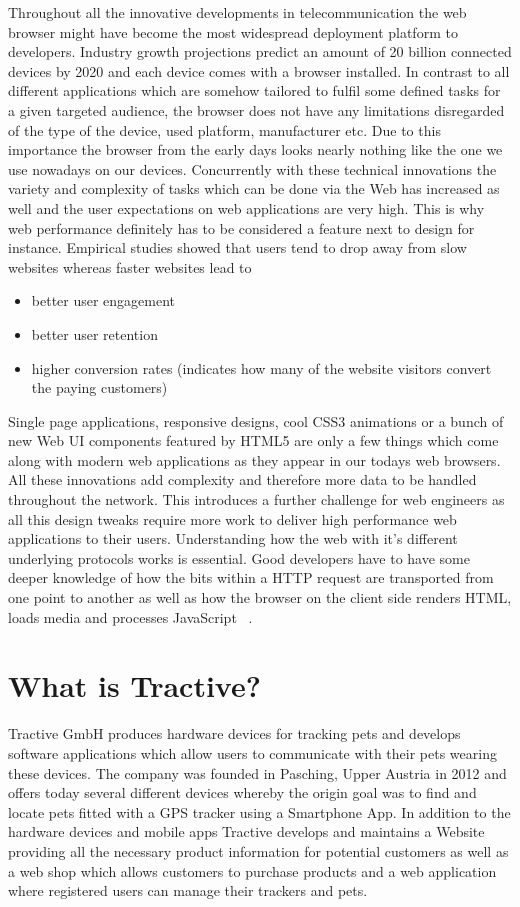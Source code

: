 Throughout all the innovative developments in telecommunication the web browser might have become the most widespread deployment platform to developers. Industry growth projections  \cite{??} predict an amount of 20 billion connected devices by 2020 and each device comes with a browser installed. In contrast to all different applications which are somehow tailored to fulfil some defined tasks for a given targeted audience, the browser does not have any limitations disregarded of the type of the device, used platform, manufacturer etc. Due to this importance the browser from the early days looks nearly nothing like the one we use nowadays on our devices. Concurrently with these technical innovations the variety and complexity of tasks which can be done via the Web has increased as well and the user expectations on web applications are very high. This is why web performance definitely has to be considered a feature next to design for instance. Empirical studies showed that users tend to drop away from slow websites whereas faster websites lead to
	\begin{itemize}
		\item better user engagement
		\item better user retention
		\item higher conversion rates (indicates how many of the website visitors convert the paying customers)
	\end{itemize}
Single page applications, responsive designs, cool CSS3 animations or a bunch of new Web UI components featured by HTML5 are only a few things which come along with modern web applications as they appear in our todays web browsers. All these innovations add complexity and therefore more data to be handled throughout the network. This introduces a further challenge for web engineers as all this design tweaks require more work to deliver high performance web applications to their users.    
Understanding how the web with it's different underlying protocols works is essential. Good developers have to have some deeper knowledge of how the bits within a HTTP request are transported from one point to another as well as how the browser on the client side renders HTML, loads media and processes JavaScript ~\cite{Grigorik_2013}.


\section{What is Tractive?}

Tractive GmbH produces hardware devices for tracking pets and develops software applications which allow users to communicate with their pets wearing these devices. The company was founded in Pasching, Upper Austria in 2012 and offers today several different devices whereby the origin goal was to find and locate pets fitted with a GPS tracker using a Smartphone App. In addition to the hardware devices and mobile apps Tractive develops and maintains a Website providing all the necessary product information for potential customers as well as a web shop which allows customers to purchase products and a web application where registered users can manage their trackers and pets. 

